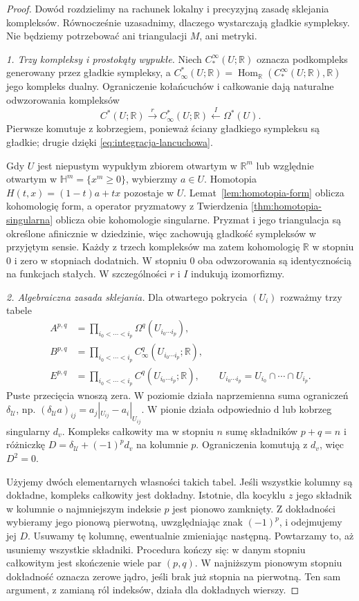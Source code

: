 \documentclass[11pt,a4paper,oneside]{report}
\newcommand{\R}{\mathbb{R}}
\newcommand{\dd}{\mathrm d}
\theoremstyle{plain}
\theoremstyle{definition}
\theoremstyle{remark}
\begin{document}
\begin{proof}
Dowód rozdzielimy na rachunek lokalny i precyzyjną
zasadę sklejania kompleksów. Równocześnie uzasadnimy,
dlaczego wystarczają gładkie sympleksy. Nie będziemy
potrzebować ani triangulacji $M$, ani metryki.

\emph{1. Trzy kompleksy i prostokąty wypukłe.}
Niech $C_*^\infty(U;\R)$ oznacza podkompleks
generowany przez gładkie sympleksy, a
$C_\infty^*(U;\R)=\operatorname{Hom}_{\R}
(C_*^\infty(U;\R),\R)$ jego kompleks dualny.
Ograniczenie kołańcuchów i całkowanie dają naturalne
odwzorowania kompleksów
\[
 C^*(U;\R)\xrightarrow{\ r\ }C_\infty^*(U;\R)
 \xleftarrow{\ I\ }\Omega^*(U).
\]
Pierwsze komutuje z kobrzegiem, ponieważ ściany
gładkiego sympleksu są gładkie; drugie dzięki
\eqref{eq:integracja-lancuchowa}.

Gdy $U$ jest niepustym wypukłym zbiorem otwartym
w $\R^m$ lub względnie otwartym w
$\mathbb H^m=\{x^m\geq0\}$, wybierzmy $a\in U$.
Homotopia $H(t,x)=(1-t)a+tx$ pozostaje w $U$.
Lemat~\ref{lem:homotopia-form} oblicza kohomologię
form, a operator pryzmatowy z Twierdzenia
\ref{thm:homotopia-singularna} oblicza obie kohomologie
singularne. Pryzmat i jego triangulacja są określone
afinicznie w dziedzinie, więc zachowują gładkość
sympleksów w przyjętym sensie. Każdy z trzech
kompleksów ma zatem kohomologię $\R$ w stopniu $0$
i zero w stopniach dodatnich. W stopniu $0$ oba
odwzorowania są identycznością na funkcjach stałych.
W szczególności $r$ i $I$ indukują izomorfizmy.

\emph{2. Algebraiczna zasada sklejania.}
Dla otwartego pokrycia $(U_i)$ rozważmy trzy tabele
\[
 \begin{aligned}
 A^{p,q}&=\prod_{i_0<\cdots<i_p}\Omega^q(U_{i_0\cdots i_p}),\\
 B^{p,q}&=\prod_{i_0<\cdots<i_p}C_\infty^q(U_{i_0\cdots i_p};\R),\\
 E^{p,q}&=\prod_{i_0<\cdots<i_p}C^q(U_{i_0\cdots i_p};\R),
 \qquad U_{i_0\cdots i_p}=U_{i_0}\cap\cdots\cap U_{i_p}.
 \end{aligned}
\]
Puste przecięcia wnoszą zera. W poziomie działa
naprzemienna suma ograniczeń $\delta_{\mathcal U}$,
np. $(\delta_{\mathcal U}a)_{ij}=a_j|_{U_{ij}}-a_i|_{U_{ij}}$.
W pionie działa odpowiednio $\dd$ lub kobrzeg singularny
$d_v$. Kompleks całkowity ma w stopniu $n$ sumę
składników $p+q=n$ i różniczkę
$D=\delta_{\mathcal U}+(-1)^p d_v$ na kolumnie $p$.
Ograniczenia komutują z $d_v$, więc $D^2=0$.

Użyjemy dwóch elementarnych własności takich tabel.
Jeśli wszystkie kolumny są dokładne, kompleks całkowity
jest dokładny. Istotnie, dla kocyklu $z$ jego składnik
w kolumnie o najmniejszym indeksie $p$ jest pionowo
zamknięty. Z dokładności wybieramy jego pionową pierwotną,
uwzględniając znak $(-1)^p$, i odejmujemy jej $D$.
Usuwamy tę kolumnę, ewentualnie zmieniając następną.
Powtarzamy to, aż usuniemy wszystkie składniki.
Procedura kończy się: w danym stopniu całkowitym jest
skończenie wiele par $(p,q)$. W najniższym pionowym
stopniu dokładność oznacza zerowe jądro, jeśli brak
już stopnia na pierwotną. Ten sam argument, z zamianą
ról indeksów, działa dla dokładnych wierszy.


\end{proof}
\end{document}
